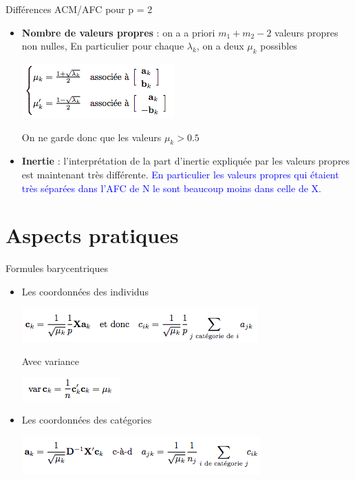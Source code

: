 \documentclass[12pt]{beamer}
\begin{document}


\begin{frame}{Différences ACM/AFC pour p = 2}
 
\begin{itemize}
 \item \textbf{ Nombre de valeurs propres} : on a a priori $m_1 + m_2 - 2$ valeurs propres non nulles, En particulier pour chaque $\lambda_k$, on a deux $\mu_k$ possibles
 
 \includegraphics[scale=0.6]{AFC4} 
 
 On ne garde donc que les valeurs $\mu_k >0.5$
 
 \item \textbf{Inertie} : l'interprétation de la part d'inertie expliquée par
les valeurs propres est maintenant très différente. \textcolor{blue}{En particulier les valeurs propres qui étaient très séparées dans
l’AFC de N le sont beaucoup moins dans celle de X.}
 
 \end{itemize} 
 
\end{frame}

\section{Aspects pratiques}

\begin{frame}{Formules barycentriques}
 
 \begin{itemize}
 \centering
 \item  Les coordonnées des individus 
 
  \includegraphics[scale=0.7]{AFC5} 
  
  Avec variance 
  
  \includegraphics[scale=0.7]{AFC6} 
 

 \item  Les coordonnées des catégories
 
 \includegraphics[scale=0.7]{AFC7} 
 
 \end{itemize}
 
 
\end{frame}
\end{document}
